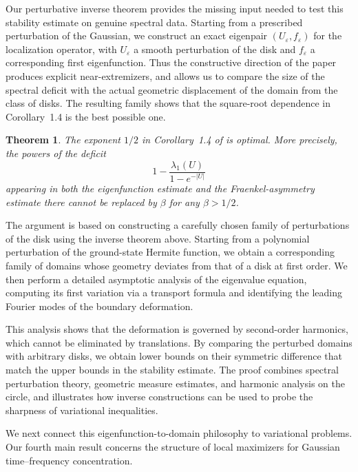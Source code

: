 \documentclass[a4paper,11pt,reqno]{amsart}
\numberwithin{equation}{section}
\theoremstyle{plain} %
\newtheorem{theorem}{Theorem}
\theoremstyle{definition} %
\theoremstyle{remark}
\begin{document}
Our perturbative inverse theorem provides the missing input needed to test this stability estimate on genuine spectral data. Starting from a prescribed perturbation of the Gaussian, we construct an exact eigenpair \((U_\varepsilon,f_\varepsilon)\) for the localization operator, with \(U_\varepsilon\) a smooth perturbation of the disk and \(f_\varepsilon\) a corresponding first eigenfunction. Thus the constructive direction of the paper produces explicit near-extremizers, and allows us to compare the size of the spectral deficit with the actual geometric displacement of the domain from the class of disks. The resulting family shows that the square-root dependence in Corollary~1.4 is the best possible one.

\begin{theorem} \label{thm:GGRT-sharp}
The exponent \(1/2\) in Corollary~1.4 of \cite{Gomez-Guerra-Ramos-Tilli} is optimal. More precisely, the powers of the deficit
\[
1-\frac{\lambda_1(U)}{1-e^{-|U|}}
\]
appearing in both the eigenfunction estimate and the Fraenkel-asymmetry estimate there cannot be replaced by \(\beta\) for any \(\beta>1/2\).
\end{theorem}

The argument is based on constructing a carefully chosen family of perturbations of the disk using the inverse theorem above. Starting from a polynomial perturbation of the ground-state Hermite function, we obtain a corresponding family of domains whose geometry deviates from that of a disk at first order. We then perform a detailed asymptotic analysis of the eigenvalue equation, computing its first variation via a transport formula and identifying the leading Fourier modes of the boundary deformation.

This analysis shows that the deformation is governed by second-order harmonics, which cannot be eliminated by translations. By comparing the perturbed domains with arbitrary disks, we obtain lower bounds on their symmetric difference that match the upper bounds in the stability estimate. The proof combines spectral perturbation theory, geometric measure estimates, and harmonic analysis on the circle, and illustrates how inverse constructions can be used to probe the sharpness of variational inequalities.

\medskip

We next connect this eigenfunction-to-domain philosophy to variational problems. Our fourth main result concerns the structure of local maximizers for Gaussian time--frequency concentration.
\end{document}
